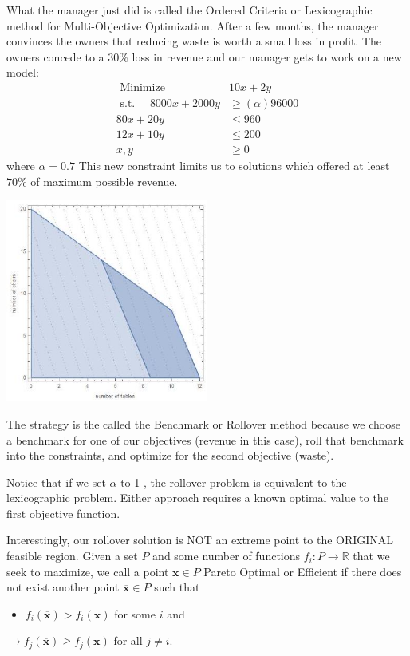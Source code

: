What the manager just did is called the Ordered Criteria or Lexicographic method for Multi-Objective Optimization. After a few months, the manager convinces the owners that reducing waste is worth a small loss in profit. The owners concede to a $30 \%$ loss in revenue and our manager gets to work on a new model:
$$
\begin{aligned}
\text { Minimize } & 10 x+2 y \\
\text { s.t. } \quad 8000 x+2000 y & \geq(\alpha) 96000 \\
80 x+20 y & \leq 960 \\
12 x+10 y & \leq 200 \\
x, y & \geq 0
\end{aligned}
$$
where $\alpha=0.7$ This new constraint limits us to solutions which offered at least $70 \%$ of maximum possible revenue.

\includegraphics[width=0.5\textwidth]{optimization/multi-objective/images/2022_02_28_634e8079070800ac7e3cg-10}

The strategy is the called the Benchmark or Rollover method because we choose a benchmark for one of our objectives (revenue in this case), roll that benchmark into the constraints, and optimize for the second objective (waste).

Notice that if we set $\alpha$ to 1 , the rollover problem is equivalent to the lexicographic problem. Either approach requires a known optimal value to the first objective function.

Interestingly, our rollover solution is NOT an extreme point to the ORIGINAL feasible region. Given a set $P$ and some number of functions $f_{i}: P \rightarrow \mathbb{R}$ that we seek to maximize, we call a point $\mathbf{x} \in P$ Pareto Optimal or Efficient if there does not exist another point $\overline{\mathbf{x}} \in P$ such that

\begin{itemize}
  \item $f_{i}(\overline{\mathbf{x}})>f_{i}(\mathbf{x})$ for some $i$ and
\end{itemize}
$\rightarrow f_{j}(\overline{\mathbf{x}}) \geq f_{j}(\mathbf{x})$ for all $j \neq i$.

